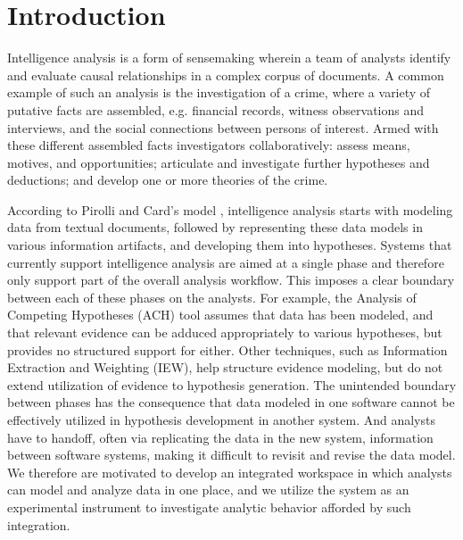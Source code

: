 \section{Introduction}\label{introduction}

Intelligence analysis is a form of sensemaking wherein a team of analysts 
identify and evaluate causal relationships in a complex corpus of documents. A 
common example of such an analysis is the investigation of a crime, where a variety of putative facts are assembled, e.g.
financial records, witness observations and interviews, and the social
connections between persons of interest. Armed with these different assembled facts
 investigators collaboratively: assess means, motives,
and opportunities; articulate and investigate further hypotheses and deductions;
and develop one or more theories of the crime. 


According to Pirolli and Card's model \cite{Pirolli2005}, intelligence analysis starts with modeling data from textual documents, followed by representing these data models in various information artifacts, and developing them into hypotheses. 
Systems that currently support intelligence analysis
are aimed at a single phase and therefore only support part of the overall analysis workflow.
This imposes a clear boundary between each of these phases on the analysts. For example, the Analysis of
Competing Hypotheses (ACH) tool assumes that data has been modeled, and that relevant
evidence can be adduced appropriately to various hypotheses, but provides no
structured support for either. Other techniques, such as Information Extraction
and Weighting (IEW), help structure evidence modeling, but do not extend
utilization of evidence to hypothesis generation. The unintended boundary between phases has the consequence that
data modeled in one software cannot be effectively utilized in hypothesis
development in another system. And analysts have to handoff, often via replicating the data in the new system, information between software systems, making it difficult to revisit and revise the data model. We
therefore are motivated to develop an integrated workspace in which analysts can
model and analyze data in one place, and we utilize the system as an
experimental instrument to investigate analytic behavior afforded by such
integration.

